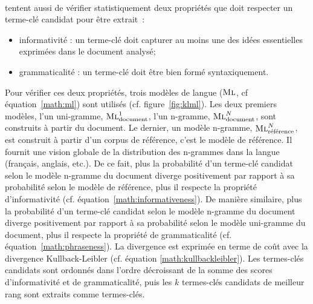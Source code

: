        ~\\ tentent aussi de vérifier
        statistiquement deux propriétés que doit respecter un terme-clé candidat
        pour être extrait~:
        \begin{itemize}
          \item{informativité : un terme-clé doit capturer au moins une des
                idées essentielles exprimées dans le document analysé;}
          \item{grammaticalité : un terme-clé doit être bien formé
                syntaxiquement.}
        \end{itemize}
        Pour vérifier ces deux propriétés, trois modèles de langue
        ($\textsc{Ml}$, cf équation~\ref{math:ml}) sont utilisés (cf. figure~\ref{fig:klml}). Les deux
        premiers modèles, l'un uni-gramme, $\textsc{Ml}_{\text{document}}^1$,
        l'un n-gramme, $\textsc{Ml}_{\text{document}}^N$, sont construits à
        partir du document. Le dernier, un modèle n-gramme,
        $\textsc{Ml}_{\text{référence}}^N$, est construit à partir d'un corpus
        de référence, c'est le modèle de référence. Il fournit une vision
        globale de la distribution des n-grammes dans la langue (français,
        anglais, etc.). De ce fait, plus la probabilité d'un terme-clé candidat
        selon le modèle n-gramme du document diverge positivement par rapport à
        sa probabilité selon le modèle de référence, plus il respecte la
        propriété d'informativité (cf. équation~\ref{math:informativeness}). De
        manière similaire, plus la probabilité d'un terme-clé candidat selon le
        modèle n-gramme du document diverge positivement par rapport à sa
        probabilité selon le modèle uni-gramme du document, plus il respecte la
        propriété de grammaticalité (cf. équation~\ref{math:phraseness}). La
        divergence est exprimée en terme de coût avec la divergence
        Kullback-Leibler (cf. équation \ref{math:kullbackleibler}). Les
        termes-clés candidats sont ordonnés dans l'ordre décroissant de la somme
        des scores d'informativité et de grammaticalité, puis les $k$
        termes-clés candidats de meilleur rang sont extraits comme termes-clés.
